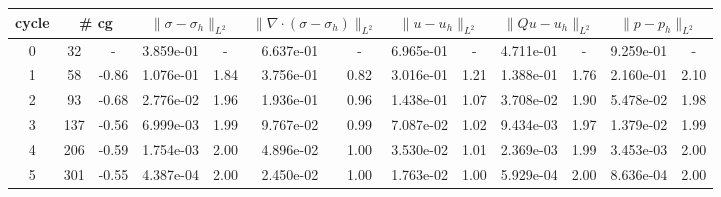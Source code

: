\documentclass[10pt]{report}
\begin{document}
\begin{table}[H]
\begin{center}
\begin{tabular}{|c|c|c|c|c|c|c|c|c|c|c|c|c|} \hline
cycle & 
\multicolumn{2}{|c|}{\# cg} & 
\multicolumn{2}{|c|}{$ \|\sigma - \sigma_h\|_{L^2} $} & 
\multicolumn{2}{|c|}{$ \|\nabla\cdot(\sigma - \sigma_h)\|_{L^2} $} & 
\multicolumn{2}{|c|}{$ \|u - u_h\|_{L^2} $} & 
\multicolumn{2}{|c|}{$ \|Qu - u_h\|_{L^2} $} & 
\multicolumn{2}{|c|}{$ \|p - p_h\|_{L^2} $}\\ \hline
0 & 32 & - & 3.859e-01 & - & 6.637e-01 & - & 6.965e-01 & - & 4.711e-01 & - & 9.259e-01 & -\\ \hline
1 & 58 & -0.86 & 1.076e-01 & 1.84 & 3.756e-01 & 0.82 & 3.016e-01 & 1.21 & 1.388e-01 & 1.76 & 2.160e-01 & 2.10\\ \hline
2 & 93 & -0.68 & 2.776e-02 & 1.96 & 1.936e-01 & 0.96 & 1.438e-01 & 1.07 & 3.708e-02 & 1.90 & 5.478e-02 & 1.98\\ \hline
3 & 137 & -0.56 & 6.999e-03 & 1.99 & 9.767e-02 & 0.99 & 7.087e-02 & 1.02 & 9.434e-03 & 1.97 & 1.379e-02 & 1.99\\ \hline
4 & 206 & -0.59 & 1.754e-03 & 2.00 & 4.896e-02 & 1.00 & 3.530e-02 & 1.01 & 2.369e-03 & 1.99 & 3.453e-03 & 2.00\\ \hline
5 & 301 & -0.55 & 4.387e-04 & 2.00 & 2.450e-02 & 1.00 & 1.763e-02 & 1.00 & 5.929e-04 & 2.00 & 8.636e-04 & 2.00\\ \hline
\end{tabular}
\end{center}
\end{table}
\end{document}
